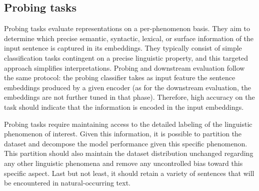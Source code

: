 \subsection{Probing tasks}





Probing tasks evaluate representations on a per-phenomenon basis. They aim to determine which precise semantic, syntactic, lexical, or surface information of the input sentence is captured in its embeddings. They typically consist of simple classification tasks contingent on a precise linguistic property, and this targeted approach simplifies interpretations. Probing and downstream evaluation follow the same protocol: the probing classifier takes as input feature the sentence embeddings produced by a given encoder (as for the downstream evaluation, the embeddings are not further tuned in that phase). Therefore, high accuracy on the task should indicate that the information is encoded in the input embeddings.

Probing tasks require maintaining access to the detailed labeling of the linguistic phenomenon of interest. Given this information, it is possible to partition the dataset and decompose the model performance given this specific phenomenon. This partition should also maintain the dataset distribution unchanged regarding any other linguistic phenomena and remove any uncontrolled bias toward this specific aspect. Last but not least, it should retain a variety of sentences that will be encountered in natural-occurring text.

